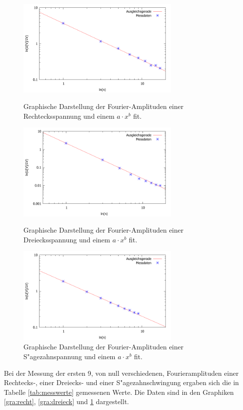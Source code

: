 \begin{figure}[!h]
	\centering
	\includegraphics[width = 8cm]{img/rechteck.pdf}
	\caption{Graphische Darstellung der Fourier-Amplituden einer Rechtecksspannung und einem $a \cdot x^b$ fit.}
	\label{gra:recht}

	\includegraphics[width = 8cm]{img/dreieck.pdf}
	\caption{Graphische Darstellung der Fourier-Amplituden einer Dreiecksspannung und einem $a \cdot x^b$ fit.}
	\label{gra:dreieck}

	\includegraphics[width = 8cm]{img/saegezahn.pdf}
	\caption{Graphische Darstellung der Fourier-Amplituden einer S"agezahnspannung und einem $a \cdot x^b$ fit.}
	\label{gra:saege}
\end{figure}

\clearpage




Bei der Messung der ersten 9, von null verschiedenen, Fourieramplituden einer Rechtecks-, einer Dreiecks- und einer S"agezahnschwingung ergaben sich die in Tabelle \ref{tab:messwerte} gemessenen Werte. Die Daten sind in den Graphiken \ref{gra:recht}, \ref{gra:dreieck} und \ref{gra:saege} dargestellt.

